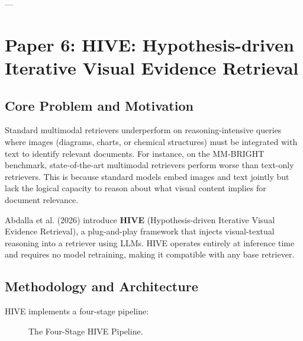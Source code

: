 \documentclass[11pt,a4paper]{article}
\begin{document}
---

\section{Paper 6: HIVE: Hypothesis-driven Iterative Visual Evidence Retrieval}
\label{sec:hive}

\subsection{Core Problem and Motivation}
Standard multimodal retrievers underperform on reasoning-intensive queries where images (diagrams, charts, or chemical structures) must be integrated with text to identify relevant documents. For instance, on the MM-BRIGHT benchmark, state-of-the-art multimodal retrievers perform worse than text-only retrievers. This is because standard models embed images and text jointly but lack the logical capacity to reason about what visual content implies for document relevance.

Abdalla et al. (2026) introduce \textbf{HIVE} (Hypothesis-driven Iterative Visual Evidence Retrieval), a plug-and-play framework that injects visual-textual reasoning into a retriever using LLMs. HIVE operates entirely at inference time and requires no model retraining, making it compatible with any base retriever.

\subsection{Methodology and Architecture}
HIVE implements a four-stage pipeline:

\begin{figure}[htbp]
\centering
{}
\caption{The Four-Stage HIVE Pipeline.}
\label{fig:hive_pipeline}
\end{figure}
\end{document}
